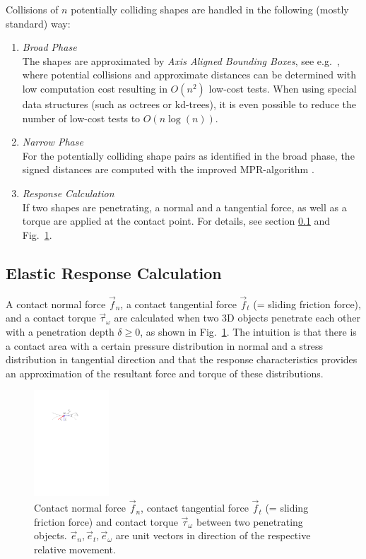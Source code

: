 Collisions of $n$ potentially colliding shapes are handled in the following (mostly standard) way:
\begin{enumerate}
	\item[1. ] \emph{Broad Phase}\\
	The shapes are approximated by \emph{Axis Aligned Bounding Boxes}, see e.g.\ \cite{bergen2003},
    where potential collisions and approximate distances can be determined with low computation cost
	resulting in $O(n^2)$ low-cost tests. When using special data structures (such as octrees or kd-trees),
	it is even possible to reduce the number of low-cost tests to $O(n \log(n))$.
	
	\item[2. ] \emph{Narrow Phase}\\
	For the potentially colliding shape pairs as identified in the broad phase,
	the signed distances are computed with the improved MPR-algorithm \cite{Neumayr2017}.
	
	\item[3. ] \emph{Response Calculation} \\
	If two shapes are penetrating, a normal and a tangential force, as well as a torque are applied at the
	contact point. For details, see section \ref{sec:responseCalculation} and 
    Fig.~\ref{fig:forces}.
\end{enumerate}


\subsection{Elastic Response Calculation}\label{sec:responseCalculation}

A contact normal force $\vec{f}_n$, a contact tangential force $\vec{f}_t$ (= sliding friction force), 
and a contact torque $\vec{\tau}_{\omega}$ are calculated when two 3D objects penetrate each other with a 
penetration depth $\delta \ge 0$, as shown in Fig.~\ref{fig:forces}. The intuition is that
there is a contact area with a certain pressure distribution in normal and a stress
distribution in tangential direction and that the response characteristics provides an
approximation of the resultant force and torque of these distributions.
%

\begin{figure}[t]
	\centering
	\includegraphics[width=0.25\textwidth]{figures/forces.pdf}
	\caption{Contact normal force $\vec{f}_n$, contact tangential force $\vec{f}_t$ 
		(= sliding friction force) and contact torque $\vec{\tau}_{\omega}$
		between two penetrating objects. $\vec{e}_n, \vec{e}_t, \vec{e}_{\omega}$ are unit vectors
		in direction of the respective relative movement.}
	\label{fig:forces}
\end{figure}

